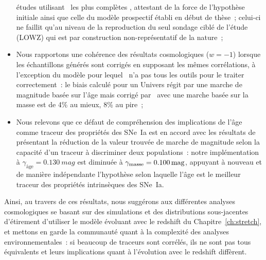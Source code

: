 \documentclass[../main/main.tex]{subfiles}
\begin{document}
\begin{itemize}
        études utilisant \snana\ les plus complètes \citep{scolnic2016,
        scolnic2018, popovic2021a}, attestant de la force de l'hypothèse
        initiale ainsi que celle du modèle prospectif établi en début de thèse~;
        celui-ci ne faillit qu'au niveau de la reproduction du seul sondage
        ciblé de l'étude (LOWZ) qui est par construction non-représentatif de la
        nature~;
    \item Nous rapportons une cohérence des résultats cosmologiques ($w=-1$)
        lorsque les échantillons générés sont corrigés en supposant les mêmes
        corrélations, à l'exception du modèle pour lequel \snana\ n'a pas tous
        les outils pour le traiter correctement~: le biais calculé pour un
        Univers régit par une marche de magnitude basée sur l'âge mais corrigé
        par \snana\ avec une marche basée sur la masse est de 4\% au mieux, 8\%
        au pire~;
    \item Nous relevons que ce défaut de compréhension des implications de l'âge
        comme traceur des propriétés des SNe~Ia est en accord avec les résultats
        de~\cite{briday2021, briday2022} présentant la réduction de la valeur
        trouvée de marche de magnitude selon la capacité d'un traceur à
        discriminer deux populations~: notre implémentation à $\gamma_\text{âge}
        = \SI{0.130}{mag}$ est diminuée à $\gamma_{\rm masse} =
        \SI{0.100}{mag}$, appuyant à nouveau et de manière indépendante
        l'hypothèse selon laquelle l'âge est le meilleur traceur des propriétés
        intrinsèques des SNe~Ia.
\end{itemize}

Ainsi, au travers de ces résultats, nous suggérons aux différentes analyses
cosmologiques se basant sur des simulations et des distributions sous-jacentes
d'étirement d'utiliser le modèle évoluant avec le redshift du
Chapitre~\ref{ch:stretch}, et mettons en garde la communauté quant à la
complexité des analyses environnementales~: si beaucoup de traceurs sont
corrélés, ils ne sont pas tous équivalents et leurs implications quant à
l'évolution avec le redshift diffèrent. 

% 
% 
\end{document}
